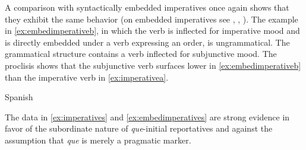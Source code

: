 A  comparison  with  syntactically embedded imperatives once again shows that they exhibit  the same behavior (on embedded imperatives see \citealt{Portner2007}, \citealt{Kaufmann2011}, \citealt{Kaufmann2013}). The example in  \eqref{ex:embedimperativeb}, in which the verb is inflected for imperative mood and is directly embedded under a verb expressing an order, is ungrammatical. The grammatical structure contains a verb inflected for subjunctive mood. The proclisis shows that the subjunctive verb surfaces lower in \eqref{ex:embedimperativeb} than the imperative verb in \eqref{ex:imperativea}.


\ea\label{ex:embedimperatives}Spanish
\z
\z

The data in \eqref{ex:imperatives} and \eqref{ex:embedimperatives} are strong evidence in favor of the subordinate nature of \emph{que}-initial reportatives and against the assumption that \emph{que} is merely a pragmatic marker. 



